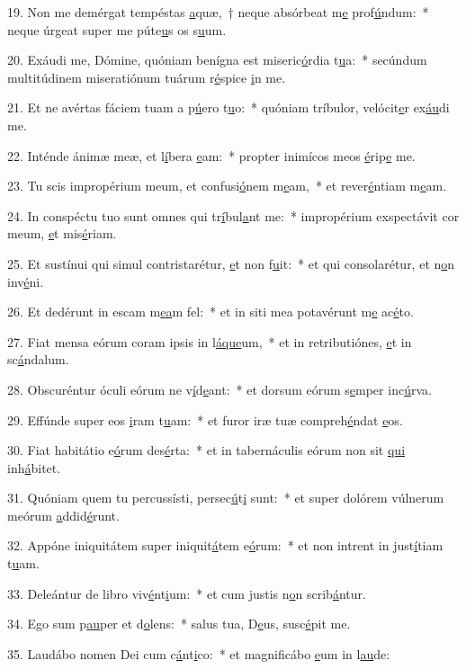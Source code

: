 19. Non me demérgat tempéstas \uline{a}quæ,~† neque absórbeat m\uline{e} prof\uline{ú}ndum:~* neque úrgeat super me púte\uline{u}s os s\uline{u}um.\par 
20. Exáudi me, Dómine, quóniam benígna est miseric\uline{ó}rdia t\uline{u}a:~* secúndum multitúdinem miseratiónum tuárum r\uline{é}spice \uline{i}n me.\par 
21. Et ne avértas fáciem tuam a p\uline{ú}ero t\uline{u}o:~* quóniam tríbulor, velócit\uline{e}r ex\uline{áu}di me.\par 
22. Inténde ánimæ meæ, et l\uline{í}bera \uline{e}am:~* propter inimícos meos \uline{é}rip\uline{e} me.\par 
23. Tu scis impropérium meum, et confusi\uline{ó}nem m\uline{e}am,~* et rever\uline{é}ntiam m\uline{e}am.\par 
24. In conspéctu tuo sunt omnes qui tr\uline{í}bul\uline{a}nt me:~* impropérium exspectávit cor meum, \uline{e}t mis\uline{é}riam.\par 
25. Et sustínui qui simul contristarétur, \uline{e}t non f\uline{u}it:~* et qui consolarétur, et n\uline{o}n inv\uline{é}ni.\par 
26. Et dedérunt in escam m\uline{e}\uline{a}m fel:~* et in siti mea potavérunt m\uline{e} ac\uline{é}to.\par 
27. Fiat mensa eórum coram ipsis in l\uline{á}\uline{que}um,~* et in retributiónes, \uline{e}t in sc\uline{á}ndalum.\par 
28. Obscuréntur óculi eórum ne v\uline{í}d\uline{e}ant:~* et dorsum eórum s\uline{e}mper inc\uline{ú}rva.\par 
29. Effúnde super eos \uline{i}ram t\uline{u}am:~* et furor iræ tuæ compreh\uline{é}ndat \uline{e}os.\par 
30. Fiat habitátio e\uline{ó}rum des\uline{é}rta:~* et in tabernáculis eórum non sit \uline{qui} inh\uline{á}bitet.\par 
31. Quóniam quem tu percussísti, persec\uline{ú}t\uline{i} sunt:~* et super dolórem vúlnerum meórum \uline{a}ddid\uline{é}runt.\par 
32. Appóne iniquitátem super iniquit\uline{á}tem e\uline{ó}rum:~* et non intrent in just\uline{í}tiam t\uline{u}am.\par 
33. Deleántur de libro viv\uline{é}nt\uline{i}um:~* et cum justis n\uline{o}n scrib\uline{á}ntur.\par 
34. Ego sum p\uline{au}per et d\uline{o}lens:~* salus tua, D\uline{e}us, susc\uline{é}pit me.\par 
35. Laudábo nomen Dei cum c\uline{á}nt\uline{i}co:~* et magnificábo \uline{e}um in l\uline{au}de:\par 
